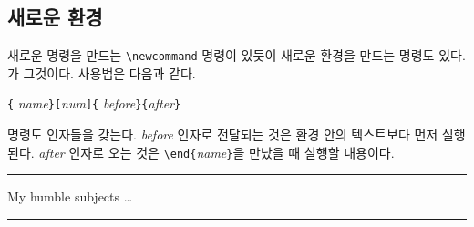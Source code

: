 \subsection{새로운 환경}
새로운 명령을 만드는 \verb|\newcommand| 명령이 있듯이 새로운 환경을 만드는 명령도 있다. 가 그것이다. 사용법은 다음과 같다.

\begin{lscommand}
\verb|{|%
       \emph{name}\verb|}[|\emph{num}\verb|]{|%
       \emph{before}\verb|}{|\emph{after}\verb|}|
\end{lscommand}

 명령도 인자들을 갖는다.
\emph{before} 인자로 전달되는 것은 환경 안의 텍스트보다 먼저 실행된다.
\emph{after} 인자로 오는 것은 \verb|\end{|\emph{name}\verb|}|을 만났을 때 실행할 내용이다.


\begin{example}
\newenvironment{king}
 {\rule{1ex}{1ex}%
      \hspace{\stretch{1}}}
 {%
      \rule{1ex}{1ex}}

\begin{king}
My humble subjects \ldots
\end{king}
\end{example}

